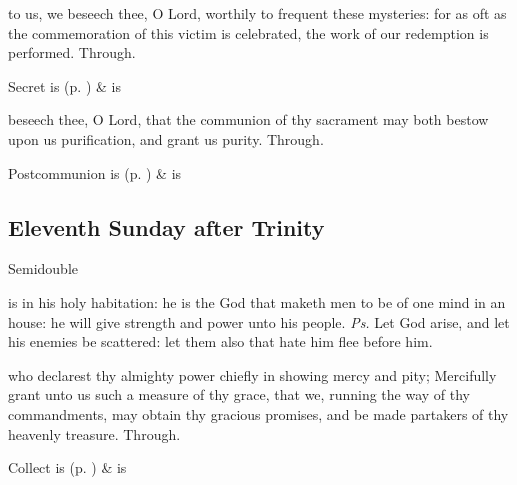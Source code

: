 \secret
{} to us, we beseech thee, O Lord, worthily to frequent these mysteries: for as oft as the commemoration of this victim is celebrated, the work of our redemption is performed. Through.
\begin{rubric}
     Secret is  (p. \pageref{SPSaints}) \&  is 
\end{rubric}


\postcommunion
{} beseech thee, O Lord, that the communion of thy sacrament may both bestow upon us purification, and grant us purity. Through.


\begin{rubric}
     Postcommunion is  (p. \pageref{SPSaints}) \&  is 
\end{rubric}


\clearpage
\subsection{Eleventh Sunday after Trinity}
\begin{inhead}
{Semidouble}
\end{inhead}


\introit
{} is in his holy habitation: he is the God that maketh men to be of one mind in an house: he will give strength and power unto his people. \textit{Ps.} Let God arise, and let his enemies be scattered: let them also that hate him flee before him.

\collect
{} who declarest thy almighty power chiefly in showing mercy and pity; Mercifully grant unto us such a measure of thy grace, that we, running the way of thy commandments, may obtain thy gracious promises, and be made partakers of thy heavenly treasure. Through.
\begin{rubric}
     Collect is  (p. \pageref{SPSaints}) \&  is 
\end{rubric}

